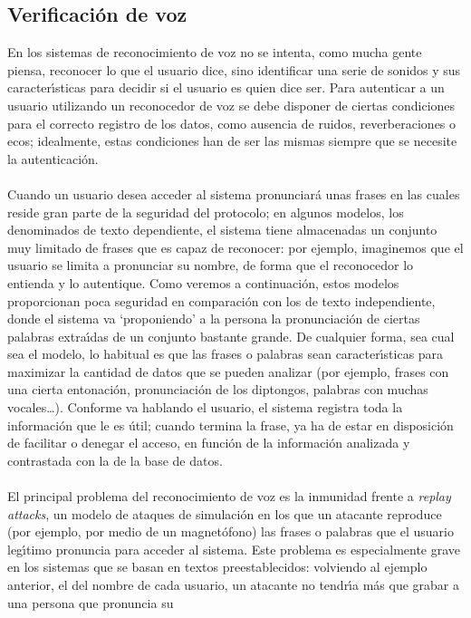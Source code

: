 \subsection{Verificaci\'on de voz}
En los sistemas de reconocimiento de voz no se intenta, como mucha gente piensa,
reconocer lo que el usuario dice, sino identificar una serie de sonidos y sus
caracter\'{\i}sticas para decidir si el usuario es quien dice ser. Para 
autenticar a un usuario utilizando un reconocedor de voz se debe disponer de 
ciertas condiciones para el correcto registro de los datos, como ausencia de 
ruidos, reverberaciones o ecos; idealmente, estas condiciones han de ser las 
mismas siempre que se necesite la autenticaci\'on.\\
\\Cuando un usuario desea acceder al sistema pronunciar\'a unas frases en las
cuales reside gran parte de la seguridad del protocolo; en algunos modelos, los
denominados de texto dependiente, el sistema tiene almacenadas un conjunto muy
limitado de frases que es capaz de reconocer: por ejemplo, imaginemos que el
usuario se limita a pronunciar su nombre, de forma que el reconocedor lo 
entienda y lo autentique. Como veremos a continuaci\'on, estos modelos 
proporcionan poca seguridad en comparaci\'on con los de texto independiente, 
donde el sistema va `proponiendo' a la persona la pronunciaci\'on de ciertas 
palabras
extra\'{\i}das de un conjunto bastante grande. De cualquier forma, sea cual sea
el modelo, lo habitual es que las frases o palabras sean caracter\'{\i}sticas
para maximizar la cantidad de datos que se pueden analizar (por ejemplo, 
frases con una cierta entonaci\'on, pronunciaci\'on de los diptongos, palabras 
con muchas vocales\ldots). Conforme va hablando el usuario, el sistema registra
toda la informaci\'on que le es \'util; cuando termina la frase, ya ha de estar
en disposici\'on de facilitar o denegar el acceso, en funci\'on de la 
informaci\'on analizada y contrastada con la de la base de datos.\\
\\El principal problema del reconocimiento de voz es la inmunidad frente a {\it 
replay attacks}, un modelo de ataques de simulaci\'on en los que un atacante
reproduce (por ejemplo, por medio de un magnet\'ofono) las frases o palabras que
el usuario leg\'{\i}timo pronuncia para acceder al sistema. Este problema es 
especialmente grave en los sistemas que se basan en textos
preestablecidos: volviendo al ejemplo anterior, el del nombre de cada usuario, 
un atacante no tendr\'{\i}a m\'as que grabar a una persona que pronuncia su
